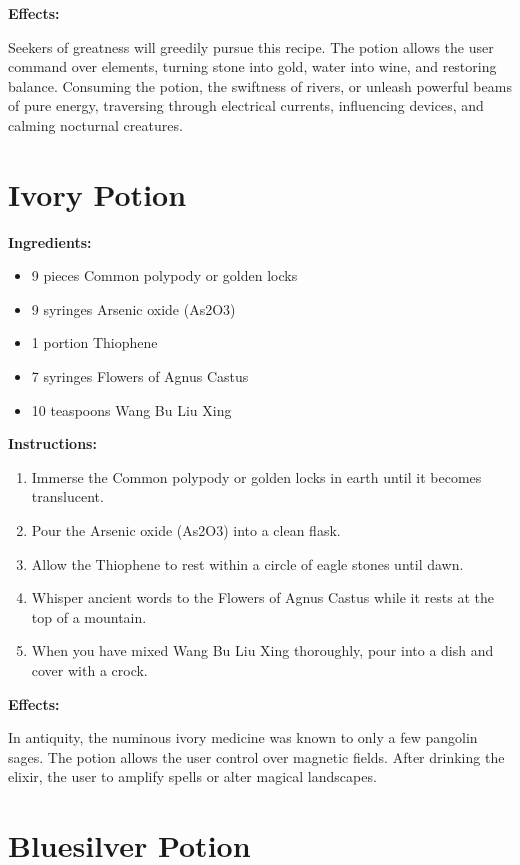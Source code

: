 \documentclass{article}
\begin{document}
\textbf{Effects:}

Seekers of greatness will greedily pursue this recipe. The potion allows the user command over elements, turning stone into gold, water into wine, and restoring balance. Consuming the potion, the swiftness of rivers, or unleash powerful beams of pure energy, traversing through electrical currents, influencing devices, and calming nocturnal creatures.

\newpage
\section*{Ivory Potion}

\textbf{Ingredients:}

\begin{itemize}
  \item 9 pieces Common polypody or golden locks
  \item 9 syringes Arsenic oxide (As2O3)
  \item 1 portion Thiophene
  \item 7 syringes Flowers of Agnus Castus
  \item 10 teaspoons Wang Bu Liu Xing
\end{itemize}

\textbf{Instructions:}

\begin{enumerate}
  \item Immerse the Common polypody or golden locks in earth until it becomes translucent.
  \item Pour the Arsenic oxide (As2O3) into a clean flask.
  \item Allow the Thiophene to rest within a circle of eagle stones until dawn.
  \item Whisper ancient words to the Flowers of Agnus Castus while it rests at the top of a mountain.
  \item When you have mixed Wang Bu Liu Xing thoroughly, pour into a dish and cover with a crock.
\end{enumerate}

\textbf{Effects:}

In antiquity, the numinous ivory medicine was known to only a few pangolin sages. The potion allows the user control over magnetic fields. After drinking the elixir, the user to amplify spells or alter magical landscapes.

\newpage
\section*{Bluesilver Potion}
\end{document}
